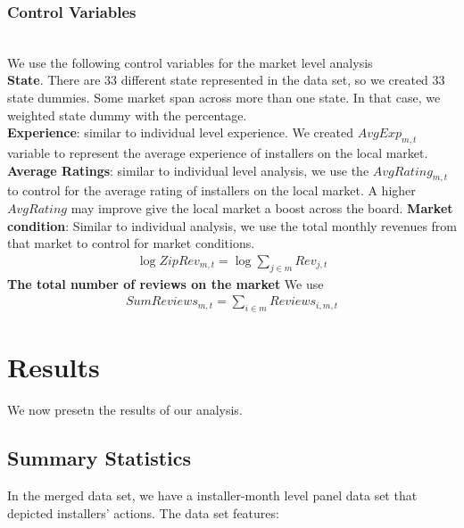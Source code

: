 \documentclass[msom,blindrev]{informs3}
\begin{document}
\subsubsection{Control Variables}\hfill\\
We use the following control variables for the market level analysis\\
\textbf{State}. There are 33 different state represented in the data set, so we created 33 state dummies. Some market span across more than one state. In that case, we weighted state dummy with the percentage. \\
\textbf{Experience}: similar to individual level experience. We created $AvgExp_{m,t}$ variable to represent the average experience of installers on the local market. 
\textbf{Average Ratings}: similar to individual level analysis, we use the $AvgRating_{m,t}$ to control for the average rating of installers on the local market. A higher $AvgRating$ may improve give the local market a boost across the board. 
\textbf{Market condition}:
Similar to individual analysis, we use the total monthly revenues from that market to control for market conditions.
\begin{align*}
\log ZipRev_{m,t}=\log \sum_{j\in m}Rev_{j,t}
\end{align*}
 \textbf{The total number of reviews on the market } We use
\begin{align*}
SumReviews_{m,t}=\sum_{i\in m} Reviews_{i,m,t}
\end{align*}


\section{Results}
We now presetn the results of our analysis.
\subsection{Summary Statistics}
In the merged data set, we have a installer-month level panel data set that depicted installers' actions. The data set features:
\end{document}
